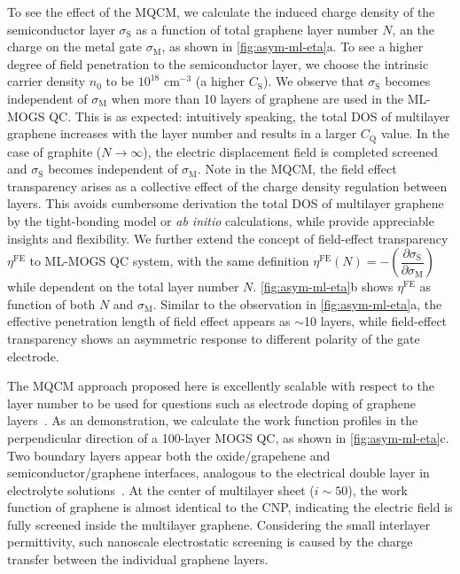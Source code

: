 To see the effect of the MQCM, we calculate the induced charge density
of the semiconductor layer $\sigma_{\mathrm{S}}$ as a function of
total graphene layer number $N$, an the charge on the metal gate
$\sigma_{\mathrm{M}}$, as shown in \autoref{fig:asym-ml-eta}a.
%
To see a higher degree of field penetration to the semiconductor
layer, we choose the intrinsic carrier density $n_{0}$ to be $10^{18}$
cm$^{-3}$ (\ie a higher $C_{\mathrm{S}}$).
%
We observe that $\sigma_{\mathrm{S}}$ becomes independent of
$\sigma_{\mathrm{M}}$ when more than 10 layers of graphene are used in
the ML-MOGS QC.
%
This is as expected: intuitively speaking, the total DOS of multilayer
graphene increases with the layer number and results in a larger
$C_{\mathrm{Q}}$ value.
%
In the case of graphite ($N \to \infty$), the electric displacement
field is completed screened and $\sigma_{\mathrm{S}}$ becomes independent
of $\sigma_{\mathrm{M}}$.
%
Note in the MQCM, the field effect transparency arises as a collective
effect of the charge density regulation between layers. This avoids
cumbersome derivation the total DOS of multilayer graphene by the
tight-bonding model \cite{Nilsson_2008_bitri_gr_electron} or
\textit{ab initio} calculations, while provide appreciable insights
and flexibility.
%
We further extend the concept of field-effect transparency
$\eta^{\mathrm{FE}}$ to ML-MOGS QC system, with the same definition
$\eta^{\mathrm{FE}}(N) = -\left(\dfrac{\partial
    \sigma_{\mathrm{S}}}{\partial \sigma_{\mathrm{M}}}\right)$ while
dependent on the total layer number $N$.
%
\autoref{fig:asym-ml-eta}b shows $\eta^{\mathrm{FE}}$ as function of both $N$ and $\sigma_{\mathrm{M}}$.
%
Similar to the observation in \autoref{fig:asym-ml-eta}a, the
effective penetration length of field effect appears as $\sim{}$10
layers, while field-effect transparency shows an asymmetric response
to different polarity of the gate electrode.
%

The MQCM approach proposed here is excellently scalable with respect
to the layer number to be used for questions such as electrode doping
of graphene
layers~\cite{Pi_2009_metal_doping_gr,Giovannetti_2008_doping}.
%
As an demonstration, we calculate the work function profiles in the
perpendicular direction of a 100-layer MOGS QC, as shown in
\autoref{fig:asym-ml-eta}c.
%
Two boundary layers appear both the oxide/grapehene and
semiconductor\allowbreak{}/graphene interfaces, analogous to the
electrical double layer in electrolyte
solutions~\cite{Bard_1980_electrochem_book}.
%
At the center of multilayer sheet ($i \sim{} 50$), the work function
of graphene is almost identical to the CNP, indicating the electric
field is fully screened inside the multilayer graphene.
%
Considering the small interlayer permittivity, such nano\-scale
electrostatic screening is caused by the charge transfer between the
individual graphene layers.

